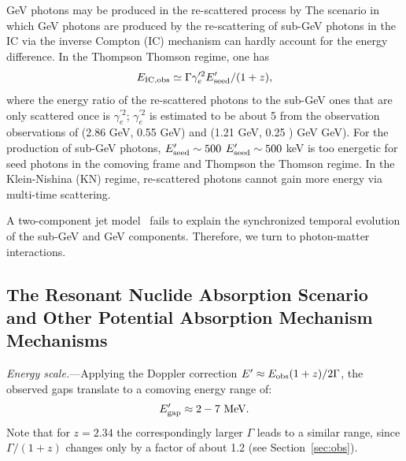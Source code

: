 \documentclass[linenumbers,twocolumn]{aastex631}
\providecommand{\DIFaddtex}[1]{{\protect\color{blue} \sf #1}} %
\providecommand{\DIFdeltex}[1]{{\protect\color{red} \scriptsize #1}} %
\providecommand{\DIFaddbegin}{} %
\providecommand{\DIFaddend}{} %
\providecommand{\DIFdelbegin}{} %
\providecommand{\DIFdelend}{} %
\providecommand{\DIFadd}[1]{\texorpdfstring{\DIFaddtex{#1}}{#1}} %
\providecommand{\DIFdel}[1]{\texorpdfstring{\DIFdeltex{#1}}{}} %
\begin{document}
 \DIFdelbegin \DIFdel{GeV photons may be produced in the re-scattered process by }\DIFdelend \DIFaddbegin \DIFadd{The scenario in which GeV photons are produced by the re-scattering of }\DIFaddend sub-GeV photons \DIFdelbegin \DIFdel{in the IC }\DIFdelend \DIFaddbegin \DIFadd{via the inverse Compton (IC) }\DIFaddend mechanism can hardly account for the energy difference. In the \DIFdelbegin \DIFdel{Thompson }\DIFdelend \DIFaddbegin \DIFadd{Thomson }\DIFaddend regime, one has
\begin{equation}
E_{\rm IC, obs}\simeq\Gamma\gamma'^{2}_e E'_{\rm seed}/(1+z),    
\end{equation}
 where the energy ratio of \DIFaddbegin \DIFadd{the }\DIFaddend re-scattered photons to \DIFaddbegin \DIFadd{the }\DIFaddend sub-GeV ones that are only scattered once is $\gamma_e^{'2}$; $\gamma_e^{'2}$ is estimated to be about 5 from the \DIFdelbegin \DIFdel{observation }\DIFdelend \DIFaddbegin \DIFadd{observations }\DIFaddend of (2.86 GeV, 0.55 GeV) and (1.21 \DIFaddbegin \DIFadd{GeV}\DIFaddend , 0.25 \DIFdelbegin \DIFdel{) GeV}\DIFdelend \DIFaddbegin \DIFadd{GeV)}\DIFaddend . For the production of sub-GeV photons, \DIFdelbegin \DIFdel{$E'_{\rm seed }\sim 500$ }\DIFdelend \DIFaddbegin \DIFadd{$E'_{\rm seed}\sim 500$ }\DIFaddend keV is too energetic for seed photons in the comoving frame and \DIFdelbegin \DIFdel{Thompson }\DIFdelend \DIFaddbegin \DIFadd{the Thomson }\DIFaddend regime.
 In the Klein-Nishina (KN) regime, re-scattered photons cannot gain more energy via multi-time scattering. 

 A two-component jet model~\citep[a fast spine and slow sheath, e.g. see][]{2025ApJ...995L...2A} fails to explain the synchronized temporal evolution of the sub-GeV and GeV components. Therefore, we turn to photon-matter interactions.

 



 
 


\subsection{The Resonant Nuclide Absorption Scenario and Other Potential Absorption \DIFdelbegin \DIFdel{Mechanism}\DIFdelend \DIFaddbegin \DIFadd{Mechanisms}\DIFaddend }
\label{sec:resonant-nuclide-absorption}\label{sec:absorption}

\textit{Energy scale.}---Applying the Doppler correction $E' \approx E_{\rm obs} (1+z) / 2\Gamma$, the observed gaps translate to a comoving energy range of:
\begin{equation}
E_{\rm gap}^{\prime} \approx 2 - 7 \text{ MeV}.
\end{equation}
\DIFaddbegin \DIFadd{Note that for $z=2.34$ the correspondingly larger $\Gamma$ leads to a similar range, since $\Gamma/(1+z)$ changes only by a factor of about 1.2 (see Section~\ref{sec:obs}).
}\DIFaddend 
\end{document}
